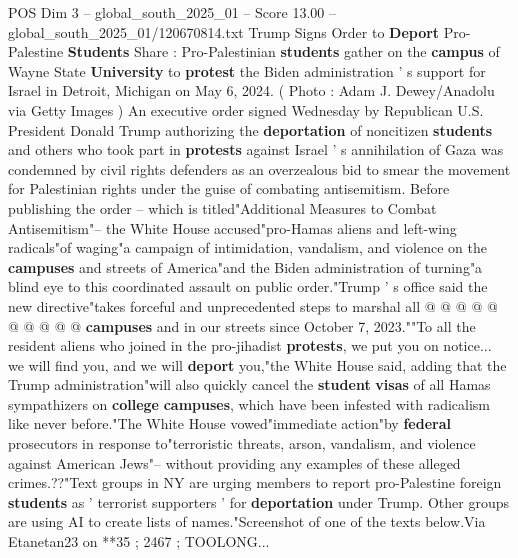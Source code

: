 \begin{textsample}{POS Dim 3 – global\_south\_2025\_01 – Score 13.00 – global\_south\_2025\_01/120670814.txt}  \label{ex:f3_pos_381}
Trump Signs Order to \textbf{Deport} Pro-Palestine \textbf{Students} Share : Pro-Palestinian \textbf{students} gather on the \textbf{campus} of Wayne State \textbf{University} to \textbf{protest} the Biden administration ' s support for Israel in Detroit, Michigan on May 6, 2024. ( Photo : Adam J.
Dewey/Anadolu via Getty Images ) An executive order signed Wednesday by Republican U.S.
President Donald Trump authorizing the \textbf{deportation} of noncitizen \textbf{students} and others who took part in \textbf{protests} against Israel ' s annihilation of Gaza was condemned by civil rights defenders as an overzealous bid to smear the movement for Palestinian rights under the guise of combating antisemitism.
Before publishing the order -- which is titled"Additional Measures to Combat Antisemitism"-- the White House accused"pro-Hamas aliens and left-wing radicals"of waging"a campaign of intimidation, vandalism, and violence on the \textbf{campuses} and streets of America"and the Biden administration of turning"a blind eye to this coordinated assault on public order."Trump ' s office said the new directive"takes forceful and unprecedented steps to marshal all @ @ @ @ @ @ @ @ @ @ \textbf{campuses} and in our streets since October 7, 2023.""To all the resident aliens who joined in the pro-jihadist \textbf{protests}, we put you on notice... we will find you, and we will \textbf{deport} you,"the White House said, adding that the Trump administration"will also quickly cancel the \textbf{student} \textbf{visas} of all Hamas sympathizers on \textbf{college} \textbf{campuses}, which have been infested with radicalism like never before."The White House vowed"immediate action"by \textbf{federal} prosecutors in response to"terroristic threats, arson, vandalism, and violence against American Jews"-- without providing any examples of these alleged crimes.??"Text groups in NY are urging members to report pro-Palestine foreign \textbf{students} as ' terrorist supporters ' for \textbf{deportation} under Trump.
Other groups are using AI to create lists of names."Screenshot of one of the texts below.Via Etanetan23 on **35 ; 2467 ; TOOLONG...

\end{textsample}

